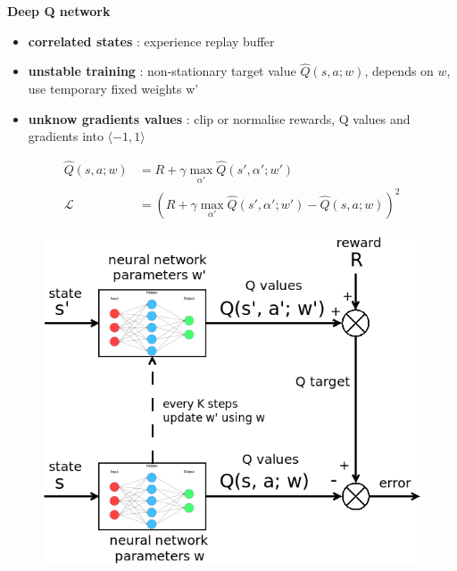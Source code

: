 \documentclass[xcolor=dvipsnames]{beamer}
\begin{document}
\begin{frame}{\bf Deep Q network}

{
    \footnotesize
    \begin{itemize}
    \item {\bf \color{red} correlated states} : experience replay buffer
    \item {\bf \color{red} unstable training} : non-stationary target value $\hat{Q}(s, a; w)$, depends on $w$, use temporary fixed weights w'
    \item {\bf \color{red} unknow gradients values} : clip or normalise rewards, Q values and gradients into $\langle -1, 1 \rangle$
    \end{itemize}
}
\begin{align*}
  \hat{Q}(s, a; w) &= R + \gamma \max \limits_{\alpha'} \hat{Q}(s', \alpha'; w') \\
  \mathcal{L} &= ( R + \gamma \max \limits_{\alpha'} \hat{Q}(s', \alpha'; w') - \hat{Q}(s, a; w) )^2
  \label{eq:dqn}
\end{align*}
\begin{figure}[!htb]
  \centering
  \includegraphics[scale=0.16]{../../diagrams/dqn.png}
  \label{img:dqn}
\end{figure}

\end{frame}
\end{document}
